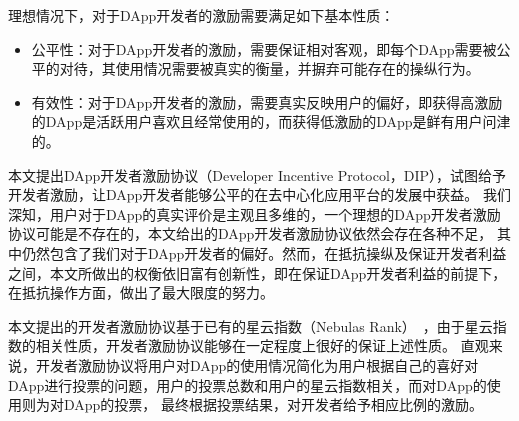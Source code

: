 理想情况下，对于DApp开发者的激励需要满足如下基本性质：
\begin{itemize}
\item 公平性：对于DApp开发者的激励，需要保证相对客观，即每个DApp需要被公平的对待，其使用情况需要被真实的衡量，并摒弃可能存在的操纵行为。
\item 有效性：对于DApp开发者的激励，需要真实反映用户的偏好，即获得高激励的DApp是活跃用户喜欢且经常使用的，而获得低激励的DApp是鲜有用户问津的。
\begin{comment}
	\item 公开性：链上的DApp激励协议与传统的评奖方式最大的不同在于，所有的评分机制必须是完全公开的，
	且其中任何统计、计算、评选的过程都是全程可见的。
	这样就杜绝了传统中心化评奖暗箱操作的可能。同时也不会出现票数统计出错等情况。
	最后，根据评选结果分配奖励的过程也会保证被执行，奖励分配正如链上交易一样可被追溯。
	\item 有效性：这也是任何评选机制所要满足的基本性质。我们期望DApp评分能够真实反映用户的评价，
	即排名高的DApp是活跃用户所喜欢的且经常被调用的，而评分低的DApp是用户鲜有问津的。
	\item 抗作弊：对于任何排名算法，都需要解决各类作弊问题。对于DIP而言，主要存在以下两类作弊问题。
	\begin{enumerate}
		\item 女巫攻击：区块链技术的一个重大特点就是一个用户建立新的节点边际成本很低。所以一个用户有可能建立多个由他控制的地址，并将他们伪装成多个正常用户来参与评选。
		一个好的激励协议应当保证每个用户无法通过女巫攻击带来巨大额外收益。
		\item 收买：由于我们衡量DApp好坏的主要指标是活跃用户调用的次数，一个DApp开发者有可能收买大量用户让他们调用自己的DApp以提高其排名从而获得更多奖励。
		这种作弊方式原则上无法杜绝，但我们期望激励协议能够让此类收买需要付出的代价变得很高以减少其出现的概率。
	\end{enumerate}
\end{comment}
\end{itemize}


本文提出DApp开发者激励协议（Developer Incentive Protocol，DIP），试图给予开发者激励，让DApp开发者能够公平的在去中心化应用平台的发展中获益。
我们深知，用户对于DApp的真实评价是主观且多维的，一个理想的DApp开发者激励协议可能是不存在的，本文给出的DApp开发者激励协议依然会存在各种不足，
其中仍然包含了我们对于DApp开发者的偏好。然而，在抵抗操纵及保证开发者利益之间，本文所做出的权衡依旧富有创新性，即在保证DApp开发者利益的前提下，在抵抗操作方面，做出了最大限度的努力。

本文提出的开发者激励协议基于已有的星云指数（Nebulas Rank）~\cite{Nebulasyellowpaper}，由于星云指数的相关性质，开发者激励协议能够在一定程度上很好的保证上述性质。
直观来说，开发者激励协议将用户对DApp的使用情况简化为用户根据自己的喜好对DApp进行投票的问题，用户的投票总数和用户的星云指数相关，而对DApp的使用则为对DApp的投票，
最终根据投票结果，对开发者给予相应比例的激励。

